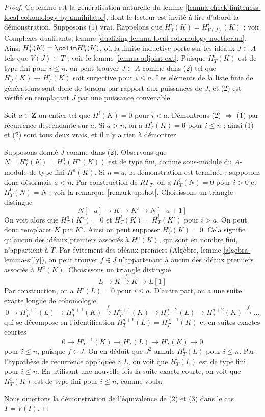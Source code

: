 \begin{proof}
Ce lemme est la généralisation naturelle du lemme \ref{lemma-check-finiteness-local-cohomology-by-annihilator}, dont le lecteur est invité à lire d'abord la démonstration. Supposons (1) vrai. Rappelons que $H^i_J(K) = H^i_{V(J)}(K)$ ; voir Complexes dualisants, lemme \ref{dualizing-lemma-local-cohomology-noetherian}. Ainsi $H^i_T(K) = \colim H^i_J(K)$, où la limite inductive porte sur les idéaux $J \subset A$ tels que $V(J) \subset T$ ; voir le lemme \ref{lemma-adjoint-ext}. Puisque $H^i_T(K)$ est de type fini pour $i \leq n$, on peut trouver $J \subset A$ comme dans (2) tel que $H^i_J(K) \to H^i_T(K)$ soit surjective pour $i \leq n$. Les éléments de la liste finie de générateurs sont donc de torsion par rapport aux puissances de $J$, et (2) est vérifié en remplaçant $J$ par une puissance convenable.

\medskip\noindent
Soit $a \in \mathbf{Z}$ un entier tel que $H^i(K) = 0$ pour $i < a$. Démontrons (2) $\Rightarrow$ (1) par récurrence descendante sur $a$. Si $a > n$, on a $H^i_T(K) = 0$ pour $i \leq n$ ; ainsi (1) et (2) sont tous deux vrais, et il n'y a rien à démontrer.

\medskip\noindent
Supposons donné $J$ comme dans (2). Observons que $N = H^a_T(K) = H^0_T(H^a(K))$ est de type fini, comme sous-module du $A$-module de type fini $H^a(K)$. Si $n = a$, la démonstration est terminée ; supposons donc désormais $a < n$. Par construction de $R\Gamma_T$, on a $H^i_T(N) = 0$ pour $i > 0$ et $H^0_T(N) = N$ ; voir la remarque \ref{remark-upshot}. Choisissons un triangle distingué
$$
N[-a] \to K \to K' \to N[-a + 1]
$$
On voit alors que $H^a_T(K') = 0$ et $H^i_T(K) = H^i_T(K')$ pour $i > a$. On peut donc remplacer $K$ par $K'$. Ainsi on peut supposer $H^a_T(K) = 0$. Cela signifie qu'aucun des idéaux premiers associés à $H^a(K)$, qui sont en nombre fini, n'appartient à $T$. Par évitement des idéaux premiers (Algèbre, lemme \ref{algebra-lemma-silly}), on peut trouver $f \in J$ n'appartenant à aucun des idéaux premiers associés à $H^a(K)$. Choisissons un triangle distingué
$$
L \to K \xrightarrow{f} K \to L[1]
$$
Par construction, on a $H^i(L) = 0$ pour $i \leq a$. D'autre part, on a une suite exacte longue de cohomologie
$$
0 \to H^{a + 1}_T(L) \to H^{a + 1}_T(K) \xrightarrow{f}
H^{a + 1}_T(K) \to H^{a + 2}_T(L) \to H^{a + 2}_T(K) \xrightarrow{f} \ldots
$$
qui se décompose en l'identification $H^{a + 1}_T(L) = H^{a + 1}_T(K)$ et en suites exactes courtes
$$
0 \to H^{i - 1}_T(K) \to H^i_T(L) \to H^i_T(K) \to 0
$$
pour $i \leq n$, puisque $f \in J$. On en déduit que $J^2$ annule $H^i_T(L)$ pour $i \leq n$. Par l'hypothèse de récurrence appliquée à $L$, on voit que $H^i_T(L)$ est de type fini pour $i \leq n$. En utilisant une nouvelle fois la suite exacte courte, on voit que $H^i_T(K)$ est de type fini pour $i \leq n$, comme voulu.

\medskip\noindent
Nous omettons la démonstration de l'équivalence de (2) et (3) dans le cas $T = V(I)$.
\end{proof}

